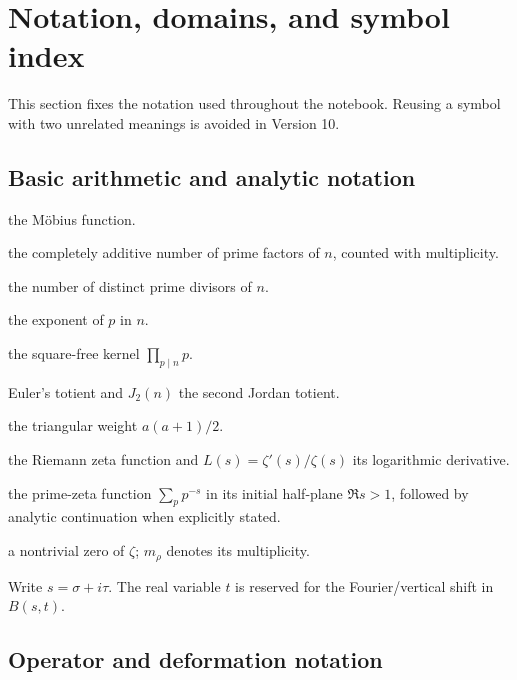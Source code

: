 \documentclass[11pt]{amsart}
\numberwithin{equation}{section}
\theoremstyle{plain}
\theoremstyle{definition}
\theoremstyle{remark}
\begin{document}
\section{Notation, domains, and symbol index}
\label{sec:notation}

This section fixes the notation used throughout the notebook.  Reusing a
symbol with two unrelated meanings is avoided in Version 10.

\subsection{Basic arithmetic and analytic notation}
\label{subsec:notation_arithmetic}

\begin{description}[leftmargin=3.2cm,style=nextline]
\item[\(\mu(n)\)] the M\"obius function.
\item[\(\Omega(n)\)] the completely additive number of prime factors of
\(n\), counted with multiplicity.
\item[\(\omega(n)\)] the number of distinct prime divisors of \(n\).
\item[\(v_p(n)\)] the exponent of \(p\) in \(n\).
\item[\(\operatorname{rad}(n)\)] the square-free kernel
\(\prod_{p\mid n}p\).
\item[\(\varphi(n)\)] Euler's totient and \(J_2(n)\) the second Jordan
totient.
\item[\(T(a)\)] the triangular weight \(a(a+1)/2\).
\item[\(\zeta(s)\)] the Riemann zeta function and
\(L(s)=\zeta'(s)/\zeta(s)\) its logarithmic derivative.
\item[\(P(s)\)] the prime-zeta function \(\sum_p p^{-s}\) in its initial
half-plane \(\Re s>1\), followed by analytic continuation when explicitly
stated.
\item[\(\rho\)] a nontrivial zero of \(\zeta\); \(m_\rho\) denotes its
multiplicity.
\item[\(s,t\)] Write \(s=\sigma+i\tau\).  The real variable \(t\) is reserved for the
Fourier/vertical shift in \(B(s,t)\).
\end{description}

\subsection{Operator and deformation notation}
\label{subsec:notation_operator}
\end{document}

